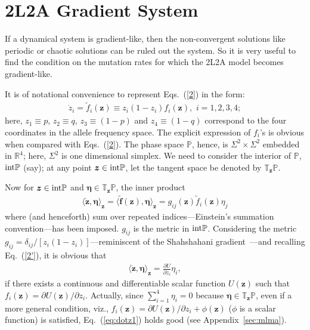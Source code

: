 \documentclass[
 pre,
 aps,
 a4paper,
 english,
 showkeys,
 reprint,
 twocolumn,
 superscriptaddress
]{revtex4}
\begin{document}
\section{2L2A Gradient System}\label{section_3}
If a dynamical system is gradient-like, then the non-convergent solutions like periodic or chaotic solutions can be ruled out the system. So it is very useful to find the condition on the mutation rates for which the 2L2A model becomes gradient-like.

It is of notational convenience to represent Eqs.~(\ref{2}) in the form: 
\begin{eqnarray}
\dot{z}_i=\tilde{f}_i({\boldsymbol{z}})\equiv z_i(1-z_i)f_i({\boldsymbol{z}}),\,\, i=1,2,3,4;\label{2'}
\end{eqnarray}
here, $z_1\equiv p$, $z_2\equiv q$, $z_3\equiv (1-p)$ and $z_4\equiv(1-q)$ correspond to the four coordinates in the allele frequency space. The explicit expression of $f_i$'s is obvious when compared with Eqs.~(\ref{2}). The phase space $\mathbb{P}$, hence, is ${\Sigma}^2\times\Sigma^2$ embedded in $\mathbb{R}^4$; here, $\Sigma^2$ is one dimensional simplex. We need to consider the interior of $\mathbb{P}$, ${\rm int}\mathbb{P}$ (say); at any point ${\boldsymbol{z}}\in {\rm int}\mathbb{P}$, let the tangent space be denoted by $\mathbb{T}_{\boldsymbol{z}}\mathbb{P}$. 

Now for ${\boldsymbol{z}}\in {\rm int}\mathbb{P}$ and $\boldsymbol{\eta}\in \mathbb{T}_{\boldsymbol{z}}\mathbb{P}$, the inner product 
\begin{eqnarray}
\langle\dot{\boldsymbol{z}}, \boldsymbol{\eta} \rangle_{\boldsymbol{z}}=\langle\boldsymbol{\tilde{f}}(\boldsymbol{z}), \boldsymbol{\eta} \rangle_{\boldsymbol{z}}=g_{ij}(\boldsymbol{z})\tilde{f}_i(\boldsymbol{z}) \eta_j
\end{eqnarray}
where (and henceforth) sum over repeated indices---Einstein's summation convention---has been imposed. $g_{ij}$ is the metric in ${\rm int}\mathbb{P}$. 
Considering the metric $g_{ij}={\delta_{ij}}/[z_i(1-z_i)]$---reminiscent of the Shahshahani gradient~\cite{hofbauer1998book,shahshahani1979ams, ebeling1985lotka}---and recalling Eq.~(\ref{2'}), it is obvious that
 \begin{eqnarray}\label{eq:dotz1}
 \langle\dot{\boldsymbol{z}}, \boldsymbol{\eta} \rangle_{\boldsymbol{z}}=\frac{\partial U}{\partial z_i}\eta_i,
 \end{eqnarray}
 if there exists a continuous and differentiable scalar function $U({\boldsymbol{z}})$ such that $f_i(\boldsymbol{z})={\partial U({\boldsymbol{z}})}/{\partial z_i}$. Actually, since $\sum_{i=1}^4\eta_i=0$ because $\boldsymbol{\eta}\in \mathbb{T}_{\boldsymbol{z}}\mathbb{P}$,  even if a more general condition, viz., $f_i(\boldsymbol{z})={\partial U({\boldsymbol{z}})}/{\partial z_i}+\phi({\boldsymbol{z}})$ ($\phi$ is a scalar function) is satisfied, Eq.~(\ref{eq:dotz1}) holds good (see Appendix~\ref{sec:mlma}).
 
\end{document}

